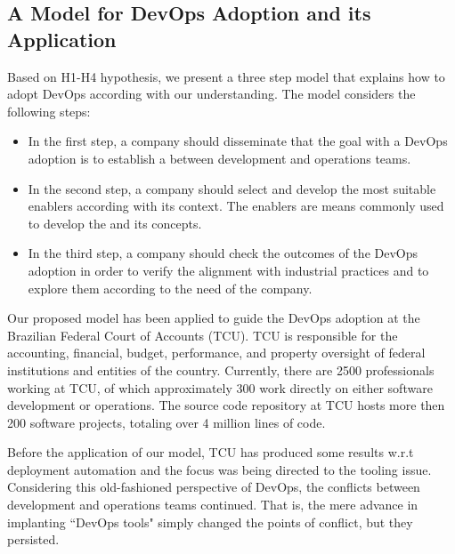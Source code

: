 \subsection{A Model for DevOps Adoption and its Application}\label{sec:case_study}

Based on H1-H4 hypothesis, we present a three step model that
explains how to adopt DevOps according with our understanding. The
model considers the following steps:
\begin{itemize}
\item In the first step, a company should
disseminate that the goal with a DevOps adoption is to
establish a \cc between
development and operations teams.

\item In the second step, a company should select and develop
the most suitable enablers according with its context. The enablers
are means commonly used to develop the 
and its concepts.

\item In the third step, a company should check the outcomes of the
DevOps adoption in order to verify the alignment with
industrial practices and to explore them according to the
need of the company.
\end{itemize}



Our proposed model has been applied to guide the DevOps adoption at the Brazilian Federal Court of
Accounts (TCU). TCU is responsible for the accounting, financial, budget, performance, and property
oversight of federal institutions and entities of the country. Currently, there are 2500
professionals working at TCU, of which approximately 300 work directly on either
software development or operations. The source code repository at TCU hosts more then 200 software projects, totaling
over 4 million lines of code.

Before the application of our model, TCU has produced some results w.r.t deployment
automation and the focus was being directed to the tooling issue. Considering this
old-fashioned perspective of DevOps, the conflicts between development and operations
teams continued. That is, the mere advance in implanting ``DevOps tools" simply
changed the points of conflict, but they persisted.

